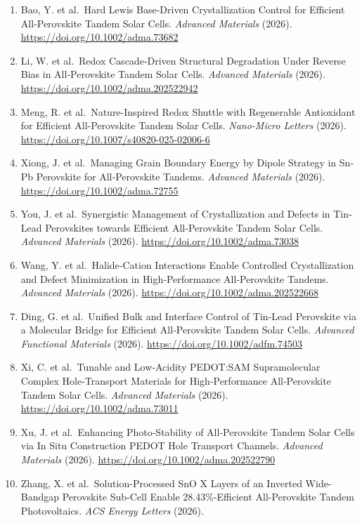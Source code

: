 \documentclass[
  11pt,
]{article}
\begin{document}
\begin{enumerate}
  \url{https://doi.org/10.1002/anie.5595275}
\item
  Bao, Y. et al.~Hard Lewis Base‐Driven Crystallization Control for
  Efficient All‐Perovskite Tandem Solar Cells. \emph{Advanced Materials}
  (2026). \url{https://doi.org/10.1002/adma.73682}
\item
  Li, W. et al.~Redox Cascade‐Driven Structural Degradation Under
  Reverse Bias in All‐Perovskite Tandem Solar Cells. \emph{Advanced
  Materials} (2026). \url{https://doi.org/10.1002/adma.202522942}
\item
  Meng, R. et al.~Nature-Inspired Redox Shuttle with Regenerable
  Antioxidant for Efficient All-Perovskite Tandem Solar Cells.
  \emph{Nano-Micro Letters} (2026).
  \url{https://doi.org/10.1007/s40820-025-02006-6}
\item
  Xiong, J. et al.~Managing Grain Boundary Energy by Dipole Strategy in
  Sn‐Pb Perovskite for All‐Perovskite Tandems. \emph{Advanced Materials}
  (2026). \url{https://doi.org/10.1002/adma.72755}
\item
  You, J. et al.~Synergistic Management of Crystallization and Defects
  in Tin‐Lead Perovskites towards Efficient All‐Perovskite Tandem Solar
  Cells. \emph{Advanced Materials} (2026).
  \url{https://doi.org/10.1002/adma.73038}
\item
  Wang, Y. et al.~Halide‐Cation Interactions Enable Controlled
  Crystallization and Defect Minimization in High‐Performance
  All‐Perovskite Tandems. \emph{Advanced Materials} (2026).
  \url{https://doi.org/10.1002/adma.202522668}
\item
  Ding, G. et al.~Unified Bulk and Interface Control of Tin‐Lead
  Perovskite via a Molecular Bridge for Efficient All‐Perovskite Tandem
  Solar Cells. \emph{Advanced Functional Materials} (2026).
  \url{https://doi.org/10.1002/adfm.74503}
\item
  Xi, C. et al.~Tunable and Low‐Acidity PEDOT:SAM Supramolecular Complex
  Hole‐Transport Materials for High‐Performance All‐Perovskite Tandem
  Solar Cells. \emph{Advanced Materials} (2026).
  \url{https://doi.org/10.1002/adma.73011}
\item
  Xu, J. et al.~Enhancing Photo‐Stability of All‐Perovskite Tandem Solar
  Cells via In Situ Construction PEDOT Hole Transport Channels.
  \emph{Advanced Materials} (2026).
  \url{https://doi.org/10.1002/adma.202522790}
\item
  Zhang, X. et al.~Solution-Processed SnO X Layers of an Inverted
  Wide-Bandgap Perovskite Sub-Cell Enable 28.43\%-Efficient
  All-Perovskite Tandem Photovoltaics. \emph{ACS Energy Letters} (2026).

\end{enumerate}
\end{document}
